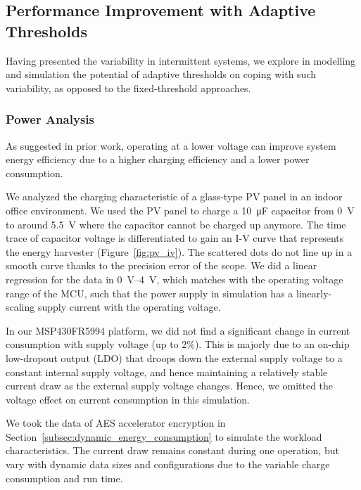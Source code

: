 \subsection{Performance Improvement with Adaptive Thresholds}

Having presented the variability in intermittent systems, we explore in modelling and simulation the potential of adaptive thresholds on coping with such variability, as opposed to the fixed-threshold approaches.


\subsubsection{Power Analysis}

As suggested in prior work, operating at a lower voltage can improve system energy efficiency due to a higher charging efficiency and a lower power consumption.

We analyzed the charging characteristic of a glass-type PV panel in an indoor office environment. 
We used the PV panel to charge a \SI{10}{\micro\farad} capacitor from \SI{0}{\volt} to around \SI{5.5}{\volt} where the capacitor cannot be charged up anymore. 
The time trace of capacitor voltage is differentiated to gain an I-V curve that represents the energy harvester (Figure~\ref{fig:pv_iv}). 
The scattered dots do not line up in a smooth curve thanks to the precision error of the scope. 
We did a linear regression for the data in \SIrange{0}{4}{\volt}, which matches with the operating voltage range of the MCU, such that the power supply in simulation has a linearly-scaling supply current with the operating voltage.



In our MSP430FR5994 platform, we did not find a significant change in current consumption with supply voltage (up to 2\%). 
This is majorly due to an on-chip low-dropout output (LDO) that droops down the external supply voltage to a constant internal supply voltage, and hence maintaining a relatively stable current draw as the external supply voltage changes. 
Hence, we omitted the voltage effect on current consumption in this simulation. 

We took the data of AES accelerator encryption in Section~\ref{subsec:dynamic_energy_consumption} to simulate the workload characteristics. 
The current draw remains constant during one operation, but vary with dynamic data sizes and configurations due to the variable charge consumption and run time.


